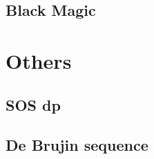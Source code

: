 \documentclass[a4paper,10pt,twocolumn,oneside]{article}
\begin{document}
%

%

\subsection{Black Magic}


\section{Others}

\subsection{SOS dp}


%

%

%

%

\subsection{De Brujin sequence}

\end{document}
